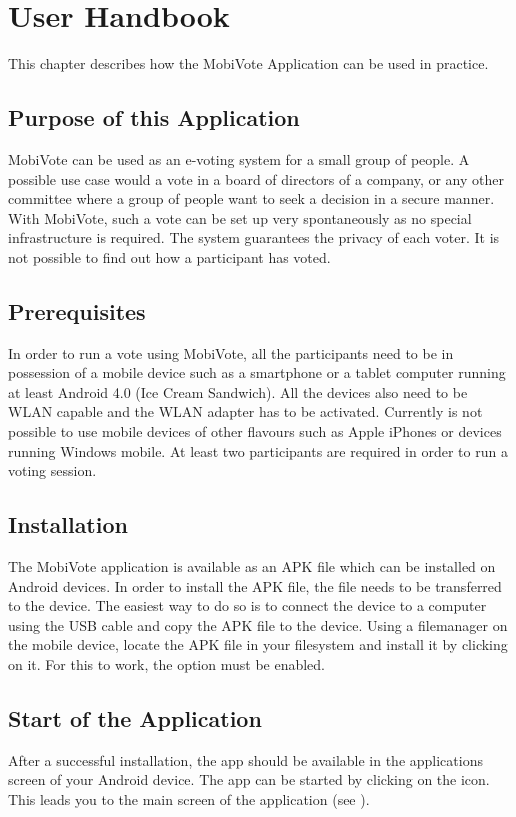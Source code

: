 \documentclass[numbers=noenddot, abstract=on, a4paper, headsepline,
footsepline, oneside, draft=off]{scrreprt}
\newcommand{\myref}[1]{(see \Vref{#1})}
\begin{document}
\chapter{User Handbook}
This chapter describes how the MobiVote Application can be used in practice.

\section{Purpose of this Application}
MobiVote can be used as an e-voting system for a small group of people. A
possible use case would a vote in a board of directors of a company, or any
other committee where a group of people want to seek a decision in a secure
manner. With MobiVote, such a vote can be set up very spontaneously as no
special infrastructure is required. The system guarantees the privacy of each
voter. It is not possible to find out how a participant has voted.

\section{Prerequisites}
In order to run a vote using MobiVote, all the participants need to be in
possession of a mobile device such as a smartphone or a tablet computer running
at least Android 4.0 (Ice Cream Sandwich). All the devices also need to be WLAN
capable and the WLAN adapter has to be activated. Currently is not possible to
use mobile devices of other flavours such as Apple iPhones or devices running
Windows mobile. At least two participants are required in order to run a voting
session.

\section{Installation}
The MobiVote application is available as an APK file which can be installed on
Android devices. In order to install the APK file, the file needs to be
transferred to the device. The easiest way to do so is to connect the device to
a computer using the USB cable and copy the APK file to the device. Using a filemanager on
the mobile device, locate the APK file in your filesystem and install it by
clicking on it. For this to work, the option  must be enabled.

\section{Start of the Application}
After a successful installation, the app should be available in the applications
screen of your Android device. The app can be started by clicking on the icon.
This leads you to the main screen of the application
\myref{fig:handbook_mainscreen}.
\end{document}
